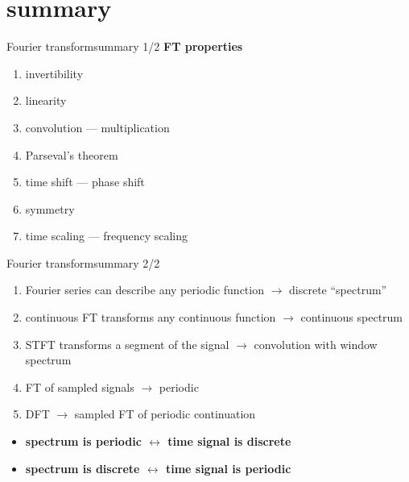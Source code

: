     \section[summary]{summary}
            \begin{frame}{Fourier transform}{summary 1/2}
                \textbf{FT properties}
                \begin{enumerate}
                    \item   invertibility
                    \item   linearity
                    \item   convolution --- multiplication
                    \item   Parseval's theorem
                    \item   time shift --- phase shift
                    \item   symmetry
                    \item   time scaling --- frequency scaling
                \end{enumerate}
            \end{frame}	
    
            \begin{frame}{Fourier transform}{summary 2/2}
                \begin{enumerate}
                    \item   Fourier series can describe any periodic function $\rightarrow$ discrete ``spectrum''
                    \item   continuous FT transforms any continuous function $\rightarrow$ continuous spectrum
                    \item   STFT transforms a segment of the signal $\rightarrow$ convolution with window spectrum
                    \item   FT of sampled signals $\rightarrow$ periodic
                    \item   DFT $\rightarrow$ sampled FT of periodic continuation
                \end{enumerate}
                    \pause
                \begin{itemize}
                    \item   \textbf{spectrum is periodic $\leftrightarrow$ time signal is discrete}
                    \item   \textbf{spectrum is discrete $\leftrightarrow$ time signal is periodic}
                \end{itemize}
            \end{frame}	
    


